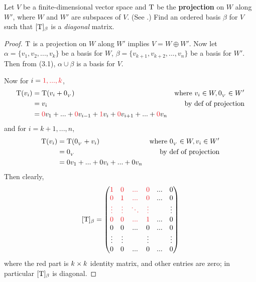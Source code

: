 \begin{exercise} \label{exercise 2.2.13}
Let \(V\) be a finite-dimensional vector space and \(\mathrm{T}\) be the \textbf{projection} on \(W\) along \(W'\), where \(W\) and \(W'\) are subspaces of \(V\). (See .)
Find an ordered basis \(\beta\) for \(V\) such that \([\mathrm{T}]_{\beta}\) is a \emph{diagonal} matrix.
\end{exercise}

\begin{proof}
\(\mathrm{T}\) is a projection on \(W\) along \(W'\) implies \(V = W \oplus W'\).
Now let \(\alpha = \{ v_1, v_2, ..., v_k \}\) be a basis for \(W\), \(\beta = \{ v_{k + 1}, v_{k + 2}, ..., v_n \}\) be a basis for \(W'\).
Then from (3.1), \(\alpha \cup \beta\) is a basis for \(V\).

Now for \(i = \RED{1, ..., k}\),
\begin{align*}
    \T(v_i) & = \T(v_i + \OV) & \text{where \(v_i \in W, \OV \in W'\)} \\
            & = v_i & \text{by def of projection} \\
            & = \RED{0} v_1 + ... + \RED{0} v_{i - 1} + \RED{1} v_i + \RED{0} v_{i + 1} + ... + \RED{0} v_n
\end{align*}
and for \(i = k + 1, ..., n\),
\begin{align*}
    \mathrm{T}(v_i) & = \mathrm{T}(0_{_V} + v_i) & \text{where \(0_{_V}\in W, v_i \in W'\)} \\
            & = 0_{_V} & \text{by def of projection} \\
            & = 0 v_1 + ... + 0 v_i + ... + 0 v_n
\end{align*}
Then clearly,
\[
    [\T]_{\beta} = \begin{pmatrix}
    \RED{1} & \RED{0} & \RED{...} & \RED{0} & ... & 0 \\
    \RED{0} & \RED{1} & \RED{...} & \RED{0} & ... & 0 \\
    \RED{\vdots} & \RED{\vdots} & \RED{\ddots} & \RED{\vdots} & & \vdots \\
    \RED{0} & \RED{0} & \RED{...} & \RED{1} & ... & 0 \\
    0 & 0 & ... & 0 & ... & 0 \\
    \vdots & \vdots & & \vdots & & \vdots \\
    0 & 0 & ... & 0 & ... & 0
    \end{pmatrix}
\]
where the red part is \(k \times k\) identity matrix, and other entries are zero;
in particular \([\mathrm{T}]_{\beta}\) is diagonal.
\end{proof}

